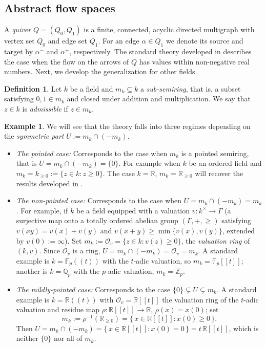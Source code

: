 \documentclass[12pt]{amsart}
\theoremstyle{plain}
\theoremstyle{definition}
\newtheorem{example}[theorem]{Example}
\newtheorem{definition}[theorem]{Definition}
\begin{document}
\subsection{Abstract flow spaces}
A \emph{quiver} $Q=(Q_0,Q_1)$ is a finite, connected, acyclic directed multigraph with vertex set $Q_0$ and edge set $Q_1$. For an edge $\alpha \in Q_1$ we denote its source and target by $\alpha^-$ and $\alpha^+$, respectively.
The standard theory developed in 
\cite{hille2003quivers} describes the case when the flow on the arrows of $Q$ has values within non-negative real numbers.  Next, we develop the generalization for other fields.
\begin{definition}
Let $k$ be a field and $m_k \subseteq k$ a \emph{sub-semiring}, that is, a subset satisfying $0, 1 \in m_k$ and closed under addition and multiplication.  We say that $z \in k$ is \emph{admissible} if $z \in m_k$. 
\end{definition}
\begin{example} We will see that the theory falls into three regimes depending on the
\emph{symmetric part} $U := m_k \cap (-m_k)$. 
\begin{itemize}
\item
\emph{The pointed case:}
Corresponds to the case when $m_k$ is a pointed semiring, that is $U = m_k \cap (-m_k) = \{0\}$. For example when $k$ be an ordered field and $m_k = k_{\geq 0} := \{z \in k : z \geq 0 \}$. The case 
 $k = \mathbb{R}$, $m_k = \mathbb{R}_{\geq 0}$ will recover the results developed in \cite{hille2003quivers}.
\item
\emph{The non-pointed case:} 
Corresponds to the case when $U = m_k \cap (-m_k) = m_k$. For example, if  $k$ be a field equipped with a valuation
$v : k^\times \to \Gamma$ (a surjective map onto a totally ordered abelian group
$(\Gamma, +, \geq)$ satisfying $v(xy) = v(x)+v(y)$ and
$v(x+y) \geq \min\{v(x),v(y)\}$, extended by $v(0) := \infty$). Set
$m_k := \mathcal{O}_v = \{z \in k : v(z) \geq 0\}$, the \emph{valuation ring} of
$(k,v)$. Since $\mathcal{O}_v$ is a ring, $U = m_k \cap (-m_k) = \mathcal{O}_v = m_k$.
A standard example is $k = \mathbb{F}_p((t))$ with the $t$-adic valuation, so
$m_k = \mathbb{F}_p[[t]]$; another is $k = \mathbb{Q}_p$ with the $p$-adic
valuation, $m_k = \mathbb{Z}_p$.
\item
\emph{The mildly-pointed case:}
Corresponds to the case $\{0\} \subsetneq U \subsetneq m_k$.  A standard example is
$k = \mathbb{R}((t))$ with $\mathcal{O}_v = \mathbb{R}[[t]]$ the valuation ring of
the $t$-adic valuation and residue map $\rho : \mathbb{R}[[t]] \to \mathbb{R}$,
$\rho(x) = x(0)$; set
\[
  m_k := \rho^{-1}(\mathbb{R}_{\geq 0})
       = \{\, x \in \mathbb{R}[[t]] : x(0) \geq 0 \,\}.
\]
Then $U = m_k \cap (-m_k) = \{\, x \in \mathbb{R}[[t]] : x(0) = 0 \,\}
= t\,\mathbb{R}[[t]] $, which is neither $\{0\}$ nor all of $m_k$.
\end{itemize}
\end{example}
\end{document}
